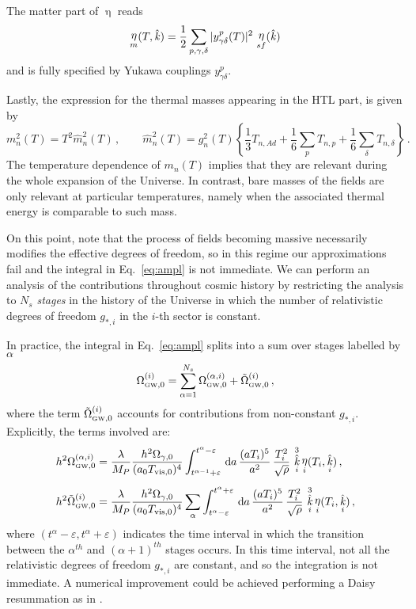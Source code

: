 \documentclass[a4paper,11pt]{article}
\DeclareMathOperator{\dif}{\, \text{d} \hspace*{-0.065cm}}
\DeclareMathOperator{\heta}{\eta}
\DeclareMathOperator{\hk}{\hat{\mathit{k}}}
\begin{document}
The matter part of $\heta$ reads
\begin{equation}\label{eq:eta_m}
\heta_{\tiny{m}}(T, \hk) =  \frac{1}{2}\sum_{p, \gamma, \delta} {|y^p_{\gamma\delta}(T)|^2\, \heta_{sf}(\hk)}
\end{equation}
and is fully specified by Yukawa couplings $ y^p_{\gamma\delta}$.

Lastly, the expression for the thermal masses appearing in the HTL part, is given by
\begin{equation}
    m_n^2 (T) =T^{2}\hat{m}_n^2(T) \,,\qquad \hat{m}_n^2(T)=  g_n^2(T)  \left \lbrace \frac{1}{3}T_{n,Ad} + \frac{1}{6}\sum_{p}{T_{n,p}}+\frac{1}{6}\sum_{\delta}{T_{n,\delta}} \right \rbrace\,.
\end{equation}
The temperature dependence of $m_n(T)$ implies that they are relevant during the whole expansion of the Universe.
In contrast,
bare masses of the fields are only relevant at particular temperatures, namely when the associated thermal energy is comparable to such mass.

On this point, note that the process of fields becoming massive necessarily modifies the effective degrees of freedom, so in this regime our approximations fail and the integral in Eq.~\eqref{eq:ampl} is not immediate.
We can perform an analysis of the contributions throughout cosmic history by restricting the analysis to $N_s$ \textit{stages} in the history of the Universe in which the number of relativistic degrees of freedom $g_{*,i}$ in the $i$-th sector is constant.

In practice,
the integral in Eq.~\eqref{eq:ampl} splits into a sum over stages labelled by $\alpha$
\begin{equation}\label{eq:stages}
    \Omega^{(i)}_{\text{\tiny{GW}},0}= \sum_{\alpha=1}^{N_s}\Omega^{(\alpha,i)}_{\text{\tiny{GW}},0} + \tilde\Omega^{(i)}_{\text{\tiny{GW}},0} \,,
\end{equation}
where the term $\tilde\Omega^{(i)}_{\text{\tiny GW},0}$ accounts for contributions from non-constant $g_{*,i}$. Explicitly, the terms involved are:
\begin{align}
h^{2}\Omega^{(\alpha,i)}_{\text{\tiny{GW}},0} &= \frac{\lambda}{M_{P}} \frac{h^2 \Omega_{\gamma, 0}}{(a_0 T_{{\rm vis},0})^4} 
    \int_{t^{\alpha-1}+\varepsilon}^{t^{\alpha}-\varepsilon}{\dif a \, \frac{(aT_i)^5}{a^2} \, \dfrac{T_{i}^{2}}{\sqrt{\rho}}\, \hk_i^3 \heta_i (T_i, \hk_i ) } \,,\\[0.5em]
h^{2}\tilde\Omega^{(i)}_{\text{\tiny{GW}},0} &= \frac{\lambda}{ M_{P}}  \frac{h^2 \Omega_{\gamma,0}}{(a_0 T_{{\rm vis},0})^4}
    \sum_{\alpha}\int_{t^{\alpha}-\varepsilon}^{t^{\alpha}+\varepsilon}{\dif a \, \frac{(aT_i)^5}{a^2} \, \dfrac{T_{i}^{2}}{\sqrt{\rho}}\, \hk_i^3 \heta_i (T_i, \hk_i )  } \,,
\end{align}
where $(t^{\alpha}-\varepsilon,t^{\alpha}+\varepsilon)$ indicates the time interval in which the transition between the $\alpha^{th}$ and $(\alpha+1)^{th}$ stages occurs. In this time interval, not all the relativistic degrees of freedom $g_{*,i}$ are constant, and so the integration is not immediate. A numerical improvement could be achieved performing a Daisy resummation as in \cite{Ringwald:2020vei}. 
\end{document}
